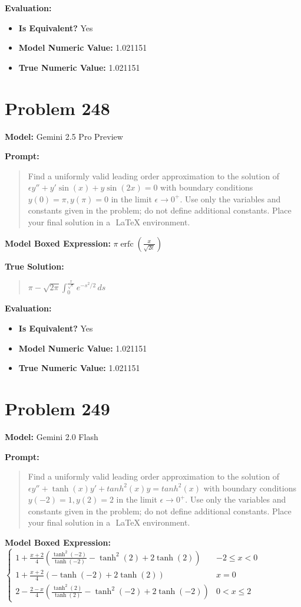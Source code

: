 \documentclass{article}
\begin{document}
{\textbf{Evaluation:}
\begin{itemize}
\item \textbf{Is Equivalent?} Yes
\item \textbf{Model Numeric Value:} 1.021151
\item \textbf{True Numeric Value:} 1.021151
\end{itemize}
\vspace{1cm}
\section*{Problem 248}
\textbf{Model:} Gemini 2.5 Pro Preview

\textbf{Prompt:}
\begin{quote}
Find a uniformly valid leading order approximation to the solution of $\epsilon y'' + y' \sin(x) + y \sin(2x) = 0$ with boundary conditions $y(0) = \pi, y(\pi) = 0$ in the limit $\epsilon \to 0^+$. Use only the variables and constants given in the problem; do not define additional constants. Place your final solution in a $\boxed{}$ LaTeX environment.
\end{quote}
\textbf{Model Boxed Expression:} $\pi \operatorname{erfc}\left(\frac{x}{\sqrt{2\epsilon}}\right)$

\textbf{True Solution:}
\begin{quote}
$\pi - \sqrt{2\pi} \int_0^{\frac{x}{\sqrt{\epsilon}}} e^{-s^2/2} \, ds$
\end{quote}

\textbf{Evaluation:}
\begin{itemize}
\item \textbf{Is Equivalent?} Yes
\item \textbf{Model Numeric Value:} 1.021151
\item \textbf{True Numeric Value:} 1.021151
\end{itemize}
\vspace{1cm}
\section*{Problem 249}
\textbf{Model:} Gemini 2.0 Flash

\textbf{Prompt:}
\begin{quote}
Find a uniformly valid leading order approximation to the solution of $\epsilon y'' + \tanh(x)y' + tanh^2(x)y=tanh^2(x)$ with boundary conditions $y(-2)=1, y(2)=2$ in the limit $\epsilon \to 0^+$. Use only the variables and constants given in the problem; do not define additional constants. Place your final solution in a $\boxed{}$ LaTeX environment.
\end{quote}
\textbf{Model Boxed Expression:} $ \begin{cases} 1 + \frac{x+2}{4}(\frac{\tanh^2(-2)}{\tanh(-2)} - \tanh^2(2) + 2 \tanh(2)) & -2 \le x < 0 \\ 1 + \frac{x+2}{4} (-\tanh(-2) + 2\tanh(2)) & x = 0 \\ 2 - \frac{2-x}{4} (\frac{\tanh^2(2)}{\tanh(2)} - \tanh^2(-2) + 2\tanh(-2)) & 0 < x \le 2 \end{cases} $

}
\end{document}
